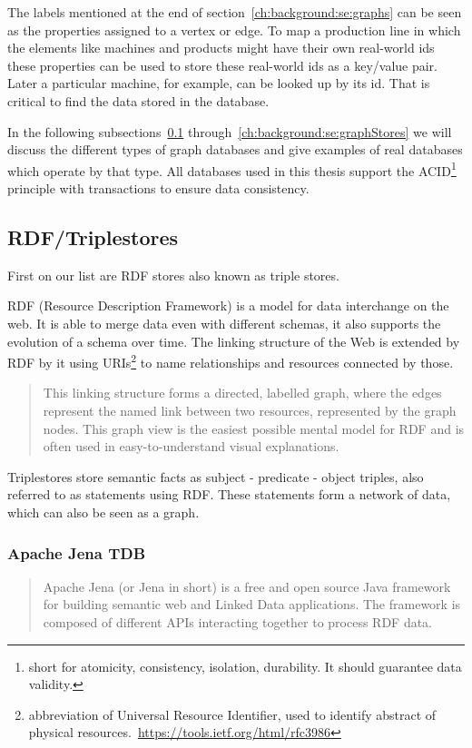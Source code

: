 The labels mentioned at the end of section~\ref{ch:background:se:graphs} can be seen as the properties assigned to a vertex or edge.
To map a production line in which the elements like machines and products might have their own real-world ids these properties can be used to store these real-world ids as a key/value pair.
Later a particular machine,
for example,
can be looked up by its id.
That is critical to find the data stored in the database.

In the following subsections~\ref{ch:background:se:rdfTriplestores} through~\ref{ch:background:se:graphStores} we will discuss the different types of graph databases and give examples of real databases which operate by that type.
All databases used in this thesis support the ACID\footnote{short for atomicity, consistency, isolation, durability. It should guarantee data validity.} principle with transactions to ensure data consistency.

\subsection{RDF/Triplestores}
\label{ch:background:se:rdfTriplestores}
First on our list are RDF stores also known as triple stores.

RDF (Resource Description Framework) is a model for data interchange on the web.
It is able to merge data even with different schemas, it also supports the evolution of a schema over time.
The linking structure of the Web is extended by RDF by it using URIs\footnote{abbreviation of Universal Resource Identifier, used to identify abstract of physical resources.~\url{https://tools.ietf.org/html/rfc3986}} to name relationships and resources connected by those.~\cite[4]{Ontotext2014}

\blockquote[\cite{W3C2014}]{This linking structure forms a directed, labelled graph, where the edges represent the named link between two resources, represented by the graph nodes.
This graph view is the easiest possible mental model for RDF and is often used in easy-to-understand visual explanations.}

Triplestores store semantic facts as subject - predicate - object triples,
also referred to as statements using RDF.
These statements form a network of data,
which can also be seen as a graph.~\cite[4]{Ontotext2014}

\subsubsection{Apache Jena TDB}
\label{ch:background:se:apacheJena}
\blockquote[\cite{Apache2015}]{Apache Jena (or Jena in short) is a free and open source Java framework for building semantic web and Linked Data applications.
The framework is composed of different APIs interacting together to process RDF data.}

